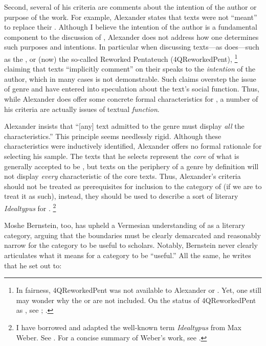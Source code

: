 Second, several of his criteria are comments about the intention of the author or purpose of the work. For example, Alexander states that \rwb texts were not ``meant'' to replace their \vorlagen. Although I believe the intention of the author is a fundamental component to the discussion of \rwb, Alexander does not address how one determines such purposes and intentions.  In particular when discussing texts---as \vermes does---such as the \pTarg, or (now) the so-called Reworked Pentateuch (4QReworkedPent),%
    \footnote{%
        In fairness, 4QReworkedPent was not available to Alexander or \vermes. Yet, one still may wonder why   the \lxx or \sampent are not included. On the status of 4QReworkedPent as \rwb, see 
        \cite{zahn2011}; 
        \cite{zahn_dsd2008}.}
claiming that \rwb texts ``implicitly comment'' on their \vorlagen speaks to the \emph{intention} of the author, which in many cases is not demonstrable. Such claims overstep the issue of genre and have entered into speculation about the text's social function. Thus, while Alexander does offer some concrete formal characteristics for \rwb, a number of his criteria are actually issues of textual \emph{function}.

Alexander insists that ``[any] text admitted to the genre must display \emph{all} the characteristics.''%
    \autocite[119 n. 11]{alexander_carson-williamson1988}
This principle seems needlessly rigid. Although these characteristics were inductively identified,  Alexander offers no formal rationale for selecting his sample. The texts that he selects represent the \emph{core} of what is generally accepted to be \rwb, but texts on the periphery of a genre by definition will not display \emph{every} characteristic of the core texts. Thus, Alexander's criteria should not be treated as prerequisites for inclusion to the category of \rwb (if we are to treat it as such), instead, they should be used to describe a sort of literary \emph{Idealtypus} for \rwb.%
    \footnote{%
        I have borrowed and adapted the well-known term \emph{Idealtypus} from Max Weber. See 
        \cite{weber1978}. For a concise summary of Weber's work, see 
        \cite[12--16]{smith-riley2009}.}

Moshe Bernstein, too, has upheld a Vermesian understanding of \rwb as a literary category, arguing that the boundaries must be clearly demarcated and reasonably narrow for the category to be useful to scholars.%
    \autocite{bernstein_textus2005}
Notably, Bernstein never clearly articulates what it means for a category to be ``useful.'' All the same, he writes that he set out to: 

